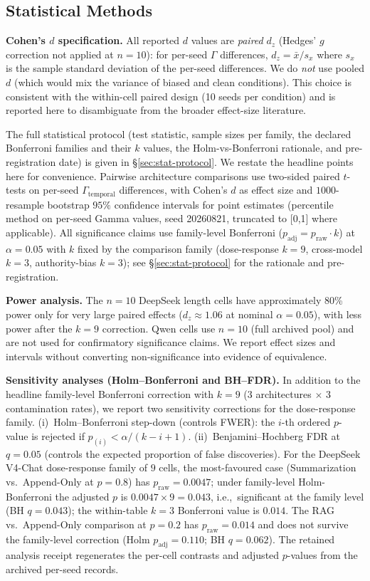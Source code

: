 \documentclass[11pt]{article}
\begin{document}
\subsection{Statistical Methods}

\textbf{Cohen's $d$ specification.} All reported $d$ values are \emph{paired} $d_z$ (Hedges' $g$ correction not applied at $n=10$): for per-seed $\Gamma$ differences, $d_z = \bar{x} / s_x$ where $s_x$ is the sample standard deviation of the per-seed differences. We do \emph{not} use pooled $d$ (which would mix the variance of biased and clean conditions). This choice is consistent with the within-cell paired design (10 seeds per condition) and is reported here to disambiguate from the broader effect-size literature.

The full statistical protocol (test statistic, sample sizes per family, the declared Bonferroni families and their $k$ values, the Holm-vs-Bonferroni rationale, and pre-registration date) is given in \S\ref{sec:stat-protocol}. We restate the headline points here for convenience. Pairwise architecture comparisons use two-sided paired $t$-tests on per-seed $\Gamma_{\text{temporal}}$ differences, with Cohen's $d$ as effect size and $1000$-resample bootstrap $95\%$ confidence intervals for point estimates (percentile method on per-seed Gamma values, seed 20260821, truncated to [0,1] where applicable). All significance claims use family-level Bonferroni ($p_{\text{adj}} = p_{\text{raw}} \cdot k$) at $\alpha = 0.05$ with $k$ fixed by the comparison family (dose-response $k=9$, cross-model $k=3$, authority-bias $k=3$); see \S\ref{sec:stat-protocol} for the rationale and pre-registration.

\textbf{Power analysis.} The $n=10$ DeepSeek length cells have approximately 80\% power only for very large paired effects ($d_z\approx1.06$ at nominal $\alpha=0.05$), with less power after the $k=9$ correction. Qwen cells use $n=10$ (full archived pool) and are not used for confirmatory significance claims. We report effect sizes and intervals without converting non-significance into evidence of equivalence.

\noindent\textbf{Sensitivity analyses (Holm--Bonferroni and BH--FDR).} In addition to the headline family-level Bonferroni correction with $k=9$ (3 architectures $\times$ 3 contamination rates), we report two sensitivity corrections for the dose-response family. (i)~Holm--Bonferroni step-down (controls FWER): the $i$-th ordered $p$-value is rejected if $p_{(i)} < \alpha / (k - i + 1)$. (ii)~Benjamini--Hochberg FDR at $q=0.05$ (controls the expected proportion of false discoveries). For the DeepSeek V4-Chat dose-response family of $9$ cells, the most-favoured case (Summarization vs.\ Append-Only at $p=0.8$) has $p_{\text{raw}}=0.0047$; under family-level Holm-Bonferroni the adjusted $p$ is $0.0047 \times 9 = 0.043$, i.e.,\ significant at the family level (BH $q = 0.043$); the within-table $k{=}3$ Bonferroni value is $0.014$. The RAG vs.\ Append-Only comparison at $p=0.2$ has $p_{\text{raw}}=0.014$ and does not survive the family-level correction (Holm $p_{\text{adj}}=0.110$; BH $q=0.062$). The retained analysis receipt regenerates the per-cell contrasts and adjusted $p$-values from the archived per-seed records.
\end{document}
